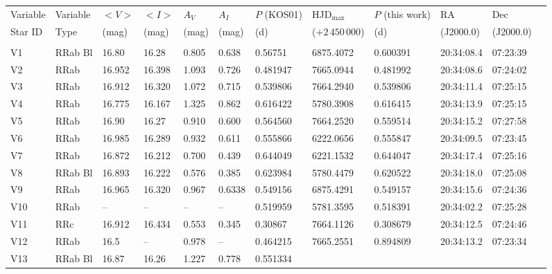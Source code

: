 \documentclass[journal]{rmaa}
\newcommand{\1}{\'{\i}}
\begin{document}
\begin{table*}
\begin{center}
\begin{tabular}{llllllllllll}
\hline
Variable & Variable & $<V>$ & $<I>$   & $A_V$  & $A_I$   & $P$ (KOS01) &
HJD$_{\mathrm{max}}$
& $P$ (this work)    & RA   & Dec         \\
Star ID  & Type     & (mag) & (mag)   & (mag)  & (mag)   & (d)  &
($+2\,450\,000$) & (d) & (J2000.0)   & (J2000.0)    \\
&&&&&&&&&&&\\
\hline
V1      & RRab Bl    & 16.80  &16.28  & 0.805       &0.638  & 0.56751
       & 6875.4072      & 0.600391     & 20:34:08.4 & 07:23:39 \\
V2       & RRab     & 16.952  & 16.398  &  1.093  & 0.726   &0.481947
        & 7665.0944    & 0.481992      & 20:34:08.6 &  07:24:02\\
V3       & RRab     & 16.912  & 16.320  &  1.072   & 0.715   &0.539806
        & 7664.2940   & 0.539806      & 20:34:11.4 &  07:25:15\\
V4       & RRab     & 16.775  & 16.167  &  1.325   & 0.862   &0.616422
        & 5780.3908    & 0.616415      & 20:34:13.9 &  07:25:15\\
V5       & RRab      & 16.90 &16.27 &0.910     & 0.600  & 0.564560
        & 7664.2520       &  0.559514     & 20:34:15.2  & 07:27:58\\
V6       & RRab      & 16.985 &16.289  &0.932     & 0.611  & 0.555866
        & 6222.0656       & 0.555847      & 20:34:09.5 &  07:23:45\\
V7       & RRab      & 16.872 & 16.212 &0.700     & 0.439  & 0.644049
        & 6221.1532     & 0.644047   & 20:34:17.4 &  07:25:16\\
V8       & RRab Bl    &16.893   & 16.222  & 0.576 & 0.385   & 0.623984
       & 5780.4479     & 0.620522   & 20:34:18.0 &  07:25:08\\
V9      & RRab      &16.965   & 16.320  &0.967   & 0.6338  & 0.549156
       & 6875.4291       & 0.549157     & 20:34:15.6  & 07:24:36\\
V10      & RRab      &--   & --  &--   & --  & 0.519959
       & 5781.3595      & 0.518391    & 20:34:02.2  & 07:25:28\\
V11       & RRc     & 16.912 &16.434 &  0.553  & 0.345   & 0.30867
        & 7664.1126    &0.308679   & 20:34:12.5  & 07:24:46\\
V12       & RRab     &16.5  & --  & 0.978    & --  & 0.464215
        & 7665.2551     &0.894809   & 20:34:13.2  & 07:23:34\\
V13       & RRab Bl    & 16.87  &16.26  & 1.227  & 0.778   & 0.551334

\end{tabular}
\end{center}
\end{table*}
\end{document}
